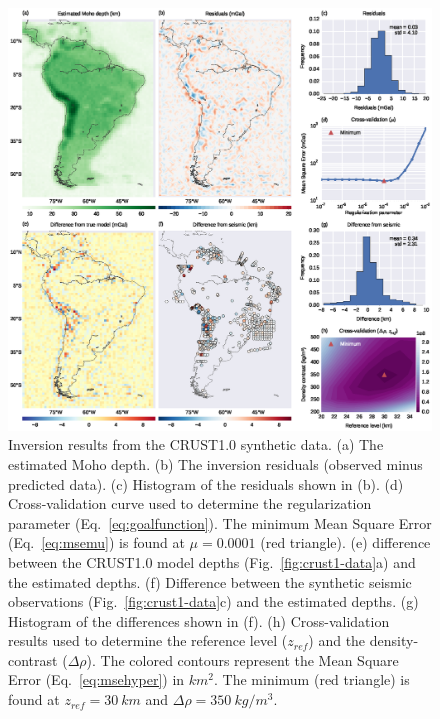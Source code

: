 \documentclass[extra,mreferee]{gji}
\begin{document}
\begin{figure}
    \centering
    \includegraphics[width=\textwidth]{figures/synthetic-crust1-results}
    \caption{
        Inversion results from the CRUST1.0 synthetic data.
        (a) The estimated Moho depth.
        (b) The inversion residuals (observed minus predicted data).
        (c) Histogram of the residuals shown in (b).
        (d) Cross-validation curve used to determine
        the regularization parameter (Eq.~\ref{eq:goalfunction}).
        The minimum Mean Square Error (Eq.~\ref{eq:msemu}) is found at
        $\mu = 0.0001$ (red triangle).
        (e) difference between the CRUST1.0 model depths
        (Fig.~\ref{fig:crust1-data}a)
        and the estimated depths.
        (f) Difference between the synthetic seismic observations
        (Fig.~\ref{fig:crust1-data}c)
        and the estimated depths.
        (g) Histogram of the differences shown in (f).
        (h) Cross-validation results used to determine
        the reference level ($z_{ref}$) and the density-contrast ($\Delta\rho$).
        The colored contours represent
        the Mean Square Error (Eq.~\ref{eq:msehyper}) in $km^2$.
        The minimum (red triangle) is found at $z_{ref} = 30\ km$
        and $\Delta\rho = 350\ kg/m^3$.
    }
    \label{fig:crust1-results}
\end{figure}
\end{document}
